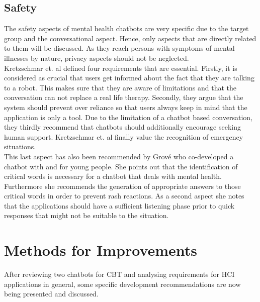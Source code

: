 \documentclass[sigconf, nonacm]{acmart}
\begin{document}
\subsection{Safety}
\label{sec:three_three}
The safety aspects of mental health chatbots are very specific due to the target group and the conversational aspect. Hence, only aspects that are directly related to them will be discussed.
As they reach persons with symptoms of mental illnesses by nature, privacy aspects should not be neglected. 
\\
Kretzschmar et. al \cite{Kretzschmar2019} defined four requirements that are essential. Firstly, it is considered as crucial that users get informed about the fact that they are talking to a robot. This makes sure that they are aware of limitations and that the conversation can not replace a real life therapy.
Secondly, they argue that the system should prevent over reliance so that users always keep in mind that the application is only a tool. 
Due to the limitation of a chatbot based conversation, they thirdly recommend that chatbots should additionally encourage seeking human support.
Kretzschmar et. al finally value the recognition of emergency situations.
\\
This last aspect has also been recommended by Grové \cite{Grove2021} who co-developed a chatbot with and for young people. She points out that the identification of critical words is necessary for a chatbot that deals with mental health.
Furthermore she recommends the generation of appropriate answers to those critical words in order to prevent rash reactions.
As a second aspect she notes that the applications should have a sufficient listening phase prior to quick responses that might not be suitable to the situation. 


\section{Methods for Improvements}
\label{sec:four}
After reviewing two chatbots for CBT and analysing requirements for HCI applications in general, some specific development recommendations are now being presented and discussed. 
\end{document}
